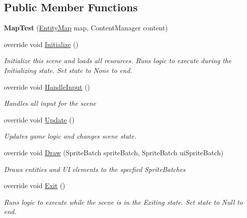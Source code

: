 \subsection*{Public Member Functions}
\begin{DoxyCompactItemize}
\item 
\hypertarget{class_midnight_blue_1_1_testing_1_1_map_test_a7fb98572efcce64a85eaec1363fdddd4}{}\label{class_midnight_blue_1_1_testing_1_1_map_test_a7fb98572efcce64a85eaec1363fdddd4} 
{\bfseries Map\+Test} (\hyperlink{class_midnight_blue_1_1_engine_1_1_entity_component_1_1_entity_map}{Entity\+Map} map, Content\+Manager content)
\item 
override void \hyperlink{class_midnight_blue_1_1_testing_1_1_map_test_adcaa2f37efbf5764b48d297cabf17784}{Initialize} ()
\begin{DoxyCompactList}\small\item\em Initialize this scene and loads all resources. Runs logic to execute during the Initializing state. Set state to None to end. \end{DoxyCompactList}\item 
override void \hyperlink{class_midnight_blue_1_1_testing_1_1_map_test_ad7e54e4aec415ccf6e89ce8a8876d259}{Handle\+Input} ()
\begin{DoxyCompactList}\small\item\em Handles all input for the scene \end{DoxyCompactList}\item 
override void \hyperlink{class_midnight_blue_1_1_testing_1_1_map_test_ae4bb817dd9c5b55bd1d818de9f527c7c}{Update} ()
\begin{DoxyCompactList}\small\item\em Updates game logic and changes scene state. \end{DoxyCompactList}\item 
override void \hyperlink{class_midnight_blue_1_1_testing_1_1_map_test_a03d0a9349662afafaa301a8581fbf01f}{Draw} (Sprite\+Batch sprite\+Batch, Sprite\+Batch ui\+Sprite\+Batch)
\begin{DoxyCompactList}\small\item\em Draws entities and UI elements to the specfied Sprite\+Batches \end{DoxyCompactList}\item 
override void \hyperlink{class_midnight_blue_1_1_testing_1_1_map_test_a7dfcf609b9fd898f377297a0075d2159}{Exit} ()
\begin{DoxyCompactList}\small\item\em Runs logic to execute while the scene is in the Exiting state. Set state to Null to end. \end{DoxyCompactList}\item 

\end{DoxyCompactItemize}
